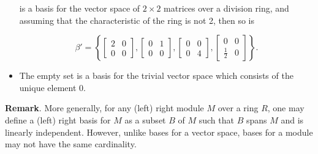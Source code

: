 \documentclass{article}
\begin{document}
\begin{itemize}
is a basis for the vector space of $2 \times 2$ matrices over a division ring, and assuming that the characteristic of the ring is not 2, then so is

$$ \beta' =   
\left\{ \begin{bmatrix}2 & 0 \\ 0 & 0 \end{bmatrix} ,
\begin{bmatrix}0 & 1 \\ 0 & 0 \end{bmatrix} ,
\begin{bmatrix}0 & 0 \\ 0 & 4 \end{bmatrix} ,
\begin{bmatrix}0 & 0 \\ \frac{1}{2} & 0 \end{bmatrix} \right\}. $$

\item The empty set is a basis for the trivial vector space which consists of the unique element $0$. 

\end{itemize}

\textbf{Remark}.  More generally, for any (left) right module $M$ over a ring $R$, one may define a (left) right basis for $M$ as a subset $B$ of $M$ such that $B$ spans $M$ and is linearly independent.  However, unlike bases for a vector space, bases for a module may not have the same cardinality.
\end{document}
